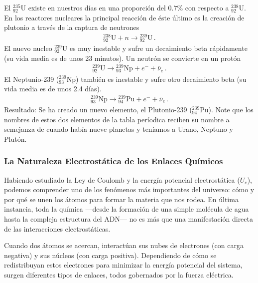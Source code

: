 \documentclass[11pt,a4paper]{book}
\begin{document}
El ${}^{235}_{92}\text{U}$ existe en nuestros días en una proporción del $0.7\%$ con respecto a ${}^{238}_{92}\text{U}$. En los reactores nucleares la principal reacción de éste último es la creación de plutonio a través de la captura de neutrones
\begin{align*}
    {}^{238}_{92}\text{U} + n\to {}^{239}_{92}\text{U}\,.
\end{align*}
El nuevo nucleo ${}^{239}_{92}\text{U}$ es muy inestable y sufre un decaimiento beta rápidamente (su vida media es de unos 23 minutos). Un neutrón se convierte en un protón
\begin{align*}
    {}^{239}_{92}\text{U} \to {}^{239}_{93}\text{Np}+e^- + \overline{\nu}_e\,.
\end{align*}
El Neptunio-239 (${}^{239}_{93}\text{Np}$) también es inestable y sufre otro decaimiento beta (su vida media es de unos 2.4 días).
\begin{align*}
{}^{239}_{93}\text{Np} \to {}^{239}_{94}\text{Pu} + e^- + \overline{\nu}_e\,.   
\end{align*}
Resultado: Se ha creado un nuevo elemento, el Plutonio-239 (${}^{239}_{94}\text{Pu}$). Note que los nombres de estos dos elementos de la tabla períodica reciben su nombre a semejanza de cuando había nueve planetas y teníamos a Urano, Neptuno y Plutón. 


\subsubsection{La Naturaleza Electrostática de los Enlaces Químicos}

Habiendo estudiado la Ley de Coulomb y la energía potencial electrostática ($U_e$), podemos comprender uno de los fenómenos más importantes del universo: cómo y por qué se unen los átomos para formar la materia que nos rodea. En última instancia, toda la química —desde la formación de una simple molécula de agua hasta la compleja estructura del ADN— no es más que una manifestación directa de las interacciones electrostáticas.

Cuando dos átomos se acercan, interactúan sus nubes de electrones (con carga negativa) y sus núcleos (con carga positiva). Dependiendo de cómo se redistribuyan estos electrones para minimizar la energía potencial del sistema, surgen diferentes tipos de enlaces, todos gobernados por la fuerza eléctrica.
\end{document}
